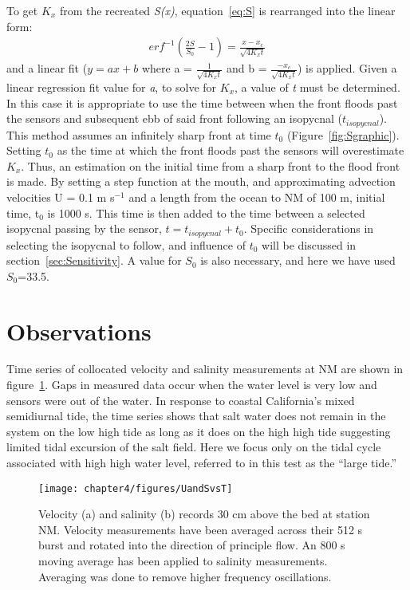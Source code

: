 To get $K_x$ from the recreated \emph{S(x)}, equation~\ref{eq:S} is rearranged into the linear form:
\begin{eqnarray}
erf^{-1}\left(\frac{2S}{S_0}-1\right) = \frac{x-x_c}{\sqrt{4K_xt}} \label{eq:linfitS}
\end{eqnarray}
and a linear fit ($y = ax + b$ where a = $\frac{1}{\sqrt{4K_xt}}$ and b = $\frac{-x_c}{\sqrt{4K_xt}}$) is applied. Given a linear regression fit value for \emph{a}, to solve for $K_x$, a value of \emph{t} must be determined. In this case it is appropriate to use the time between when the front floods past the sensors and subsequent ebb of said front following an isopycnal ($t_{isopycnal}$). This method assumes an infinitely sharp front at time $t_0$ (Figure~\ref{fig:Sgraphic}). Setting $t_0$ as the time at which the front floods past the sensors will overestimate $K_x$. Thus, an estimation on the initial time from a sharp front to the flood front is made. By setting a step function at the mouth, and approximating advection velocities U = 0.1 m s$^{-1}$ and a length from the ocean to NM of 100 m, initial time, t$_0$ is 1000 s. This time is then added to the time between a selected isopycnal passing by the sensor, $t = t_{isopycnal}+t_0$. Specific considerations in selecting the isopycnal to follow, and influence of $t_0$ will be discussed in section~\ref{sec:Sensitivity}. A value for $S_0$ is also necessary, and here we have used $S_0$=33.5.



\section{Observations} \label{sec:ObsCh4}
Time series of collocated velocity and salinity measurements at NM are shown in figure~\ref{fig:UandSvsTch4}. Gaps in measured data occur when the water level is very low and sensors were out of the water. In response to coastal California's mixed semidiurnal tide, the time series shows that salt water does not remain in the system on the low high tide  as long as it does on the high high tide suggesting limited tidal excursion of the salt field. Here we focus only on the tidal cycle associated with high high water level, referred to in this test as the \textquotedblleft large tide.''

\begin{figure}[h]
	\texttt{[image: chapter4/figures/UandSvsT]} 
\caption{Velocity (a) and salinity (b) records 30 cm above the bed at station NM. Velocity measurements have been averaged across their 512 s burst and rotated into the direction of principle flow. An 800 s moving average has been applied to salinity measurements. Averaging was done to remove higher frequency oscillations.} \label{fig:UandSvsTch4}
\end{figure}


